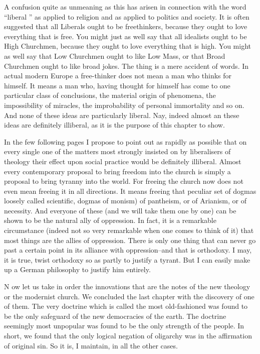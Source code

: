 \documentclass{book}
\begin{document}
A confusion quite as unmeaning as this has arisen in connection with the word “liberal ” as applied to religion and as applied to politics and society. It is often suggested that all Liberals ought to be freethinkers, because they ought to love everything that is free. You might just as well say that all idealists ought to be High Churchmen, because they ought to love everything that is high. You might as well say that Low Churchmen ought to like Low Mass, or that Broad Churchmen ought to like broad jokes. The thing is a mere accident of words. In actual modern Europe a free-thinker does not mean a man who thinks for himself. It means a man who, having thought for himself has come to one particular class of conclusions, the material origin of phenomena, the impossibility of miracles, the improbability of personal immortality and so on. And none of these ideas are particularly liberal. Nay, indeed almost an these ideas are definitely illiberal, as it is the purpose of this chapter to show.

In the few following pages I propose to point out as rapidly as possible that on every single one of the matters most strongly insisted on by liberalisers of theology their effect upon social practice would be definitely illiberal. Almost every contemporary proposal to bring freedom into the church is simply a proposal to bring tyranny into the world. For freeing the church now does not even mean freeing it in all directions. It means freeing that peculiar set of dogmas loosely called scientific, dogmas of monism) of pantheism, or of Arianism, or of necessity. And everyone of these (and we will take them one by one) can be shown to be the natural ally of oppression. In fact, it is a remarkable circumstance (indeed not so very remarkable when one comes to think of it) that most things are the allies of oppression. There is only one thing that can never go past a certain point in its alliance with oppression–and that is orthodoxy. I may, it is true, twist orthodoxy so as partly to justify a tyrant. But I can easily make up a German philosophy to justify him entirely.

N ow let us take in order the innovations that are the notes of the new theology or the modernist church. We concluded the last chapter with the discovery of one of them. The very doctrine which is called the most old-fashioned was found to be the only safeguard of the new democracies of the earth. The doctrine seemingly most unpopular was found to be the only strength of the people. In short, we found that the only logical negation of oligarchy was in the affirmation of original sin. So it is, I maintain, in all the other cases.
\end{document}
